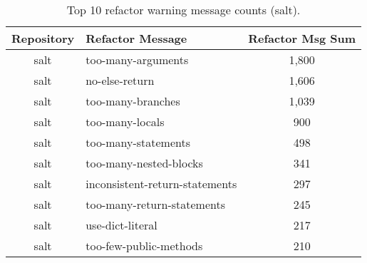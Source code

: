 \begin{table}[ht]
  \centering
  \begin{tabularx}{1.0\textwidth} {
    | c
    | >{\centering\arraybackslash}X 
    | c |
  }
    \hline
      Repository & Refactor Message & Refactor Msg Sum \\
    \hline\hline
      salt & too-many-arguments & 1,800 \\
      salt & no-else-return & 1,606 \\
      salt & too-many-branches & 1,039 \\
      salt & too-many-locals & 900 \\
      salt & too-many-statements & 498 \\
      salt & too-many-nested-blocks & 341 \\
      salt & inconsistent-return-statements & 297 \\
      salt & too-many-return-statements & 245 \\
      salt & use-dict-literal & 217 \\
      salt & too-few-public-methods & 210 \\
    \hline
  \end{tabularx}
  \caption{Top 10 refactor warning message counts (salt).}
  \label{table:refactorMessagesSalt}
\end{table}